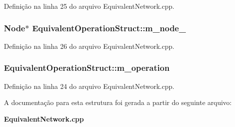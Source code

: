Definição na linha 25 do arquivo Equivalent\+Network.\+cpp.

\subsubsection[{m\+\_\+node\+\_\+2}]{\setlength{\rightskip}{0pt plus 5cm}Node$\ast$ Equivalent\+Operation\+Struct\+::m\+\_\+node\+\_}\label{struct_equivalent_operation_struct_a605cd5593566d0ae7fafccf3df838976}


Definição na linha 26 do arquivo Equivalent\+Network.\+cpp.

\subsubsection[{m\+\_\+operation}]{ Equivalent\+Operation\+Struct\+::m\+\_\+operation}\label{struct_equivalent_operation_struct_adefb8f5d0d63de8bed7005817be40bd9}


Definição na linha 24 do arquivo Equivalent\+Network.\+cpp.



A documentação para esta estrutura foi gerada a partir do seguinte arquivo\+:\begin{DoxyCompactItemize}
\item 
{\bf Equivalent\+Network.\+cpp}\end{DoxyCompactItemize}
